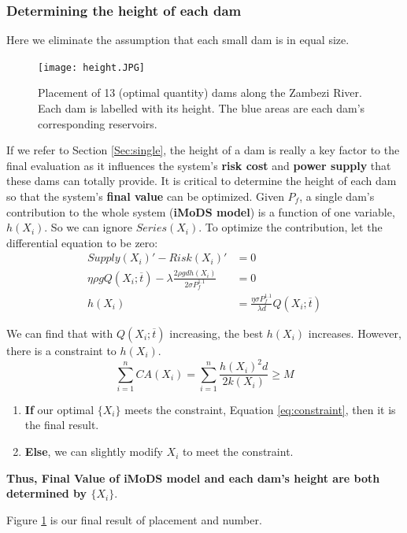 \documentclass{mcmthesis}
\begin{document}
\subsubsection{Determining the height of each dam}
Here we eliminate the assumption that each small dam is in equal size.
\begin{figure}[h]
    \centering
    \texttt{[image: height.JPG]}
    \caption{Placement of 13 (optimal quantity) dams along the Zambezi River. Each dam is labelled with its height. The blue areas are each dam's corresponding reservoirs.}
    \label{fig:height}
\end{figure}
If we refer to Section \ref{Sec:single}, the height of a dam is really a key factor to the final evaluation as it influences the system's \textbf{risk cost} and \textbf{power supply} that these dams can totally provide. It is critical to determine the height of each dam so that the system's \textbf{final value} can be optimized. Given $P_f$, a single dam's contribution to the whole system (\textbf{iMoDS model}) is a function of one variable, $h(X_i)$. So we can ignore $Series(X_i)$. To optimize the contribution, let the differential equation to be zero:
\begin{align}
\label{eq:height}
Supply(X_i)'-Risk(X_i)' &= 0\nonumber\\
\eta \rho g Q(X_i;\overline{t}) - \lambda \frac{2\rho g d h(X_i)}{2\sigma P_f^{1.1}} & = 0\nonumber\\
h(X_i) & = \frac{\eta \sigma P_f^{1.1}}{\lambda d}Q(X_i;\overline{t})
\end{align}

We can find that with $Q(X_i;\overline{t})$ increasing, the best $h(X_i)$ increases. However, there is a constraint to $h(X_i)$.
\begin{equation}
\label{eq:constraint}
	\sum_{i=1}^n CA(X_i) = \sum_{i=1}^n{\frac{h(X_i)^2d}{2k(X_i)}}\ge M
\end{equation}
\begin{enumerate}
\item \textbf{If} our optimal $\{X_i\}$ meets the constraint, Equation \ref{eq:constraint}, then it is the final result.
\item \textbf{Else}, we can slightly modify $X_i$ to meet the constraint.
\end{enumerate}

\textbf{Thus, Final Value of iMoDS model and each dam's height are both determined by $\{X_i\}$}.

Figure \ref{fig:height} is our final result of placement and number.
\end{document}
